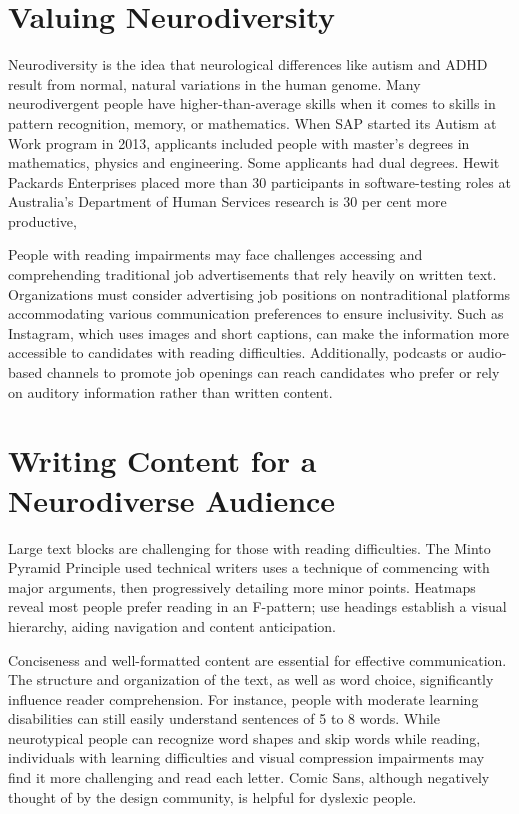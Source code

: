 \documentclass{article}
\begin{document}
\section{Valuing Neurodiversity }

Neurodiversity is the idea that neurological differences like autism and ADHD result from normal, natural variations in the human genome. Many neurodivergent people have higher-than-average skills when it comes to skills in pattern recognition, memory, or mathematics. When SAP started its Autism at Work program in 2013, applicants included people with master's degrees in mathematics, physics and engineering. Some applicants had dual degrees. Hewit Packards Enterprises placed more than 30 participants in software-testing roles at Australia's Department of Human Services research is 30 per cent more productive, \cite{Pisano}  

People with reading impairments may face challenges accessing and comprehending traditional job advertisements that rely heavily on written text. Organizations must consider advertising job positions on nontraditional platforms accommodating various communication preferences to ensure inclusivity. Such as Instagram, which uses images and short captions, can make the information more accessible to candidates with reading difficulties. Additionally, podcasts or audio-based channels to promote job openings can reach candidates who prefer or rely on auditory information rather than written content.


\section{Writing Content for a Neurodiverse Audience}
 
Large text blocks are challenging for those with reading difficulties. The Minto Pyramid Principle used technical writers uses a technique of commencing with major arguments, then progressively detailing more minor points. Heatmaps reveal most people prefer reading in an F-pattern; use headings establish a visual hierarchy, aiding navigation and content anticipation. 

Conciseness and well-formatted content are essential for effective communication. The structure and organization of the text, as well as word choice, significantly influence reader comprehension. For instance, people with moderate learning disabilities can still easily understand sentences of 5 to 8 words. While neurotypical people can recognize word shapes and skip words while reading, individuals with learning difficulties and visual compression impairments may find it more challenging and read each letter. Comic Sans, although negatively thought of by the design community, is helpful for dyslexic people.
\end{document}

